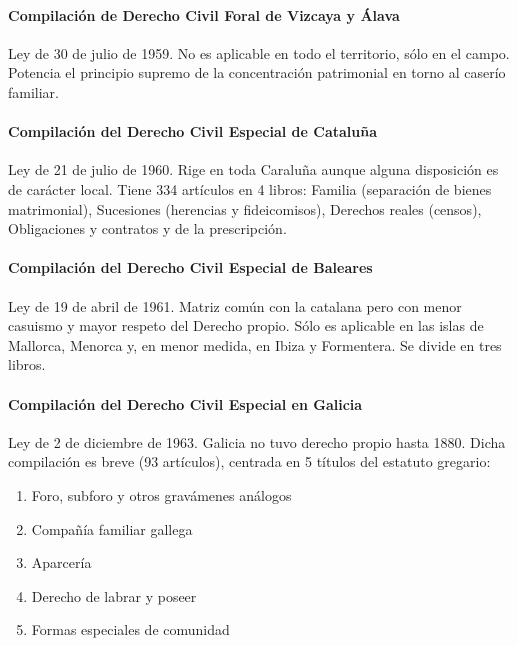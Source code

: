 \documentclass[a4paper,12pt]{report}
\begin{document}
\paragraph{Compilación de Derecho Civil Foral de Vizcaya y Álava}

Ley de 30 de julio de 1959. No es aplicable en todo el territorio, sólo en el
campo. Potencia el principio supremo de la concentración patrimonial en torno al
caserío familiar.

\paragraph{Compilación del Derecho Civil Especial de Cataluña}

Ley de 21 de julio de 1960. Rige en toda Caraluña aunque alguna disposición es
de carácter local. Tiene 334 artículos en 4 libros: Familia (separación de
bienes matrimonial), Sucesiones (herencias y fideicomisos), Derechos reales
(censos), Obligaciones y contratos y de la prescripción.

\paragraph{Compilación del Derecho Civil Especial de Baleares}

Ley de 19 de abril de 1961. Matriz común con la catalana pero con menor casuismo
y mayor respeto del Derecho propio. Sólo es aplicable en las islas de Mallorca,
Menorca y, en menor medida, en Ibiza y Formentera. Se divide en tres libros.

\paragraph{Compilación del Derecho Civil Especial en Galicia}

Ley de 2 de diciembre de 1963. Galicia no tuvo derecho propio hasta 1880. Dicha
compilación es breve (93 artículos), centrada en 5 títulos del estatuto
gregario:

\begin{enumerate}
\item{Foro, subforo y otros gravámenes análogos}
\item{Compañía familiar gallega}
\item{Aparcería}
\item{Derecho de labrar y poseer}
\item{Formas especiales de comunidad}
\end{enumerate}
\end{document}

